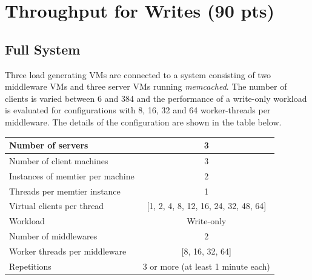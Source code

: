 \documentclass[report.tex]{subfiles}
\begin{document}
\section{Throughput for Writes (90 pts)}\label{exp4}

\subsection{Full System}

Three load generating VMs are connected to a system  consisting of two middleware VMs and three server VMs running \emph{memcached}.
The number of clients is varied between 6 and 384 and the performance of a write-only workload is evaluated for configurations with 8, 16, 32 and 64 worker-threads per middleware. The details of the configuration are shown in the table below.


\begin{center}
	\scriptsize{
		\begin{tabular}{|l|c|}
			\hline Number of servers                & 3          \\ 
			\hline Number of client machines        & 3          \\ 
			\hline Instances of memtier per machine & 2          \\ 
			\hline Threads per memtier instance     & 1          \\
			\hline Virtual clients per thread       & [1, 2, 4, 8, 12, 16, 24, 32, 48, 64]    \\ 
			\hline Workload                         & Write-only \\
			\hline Number of middlewares            & 2          \\
			\hline Worker threads per middleware    & [8, 16, 32, 64]    \\
			\hline Repetitions                      & 3 or more (at least 1 minute each)  \\ 
			\hline 
		\end{tabular}
	} 
\end{center}
\end{document}

